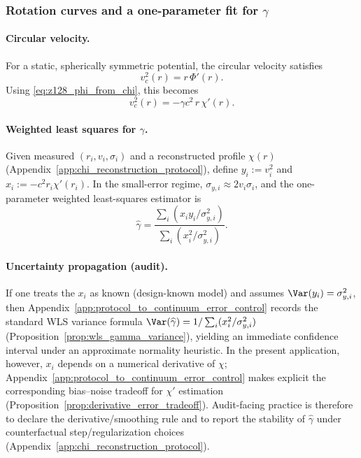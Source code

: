 \subsubsection{Rotation curves and a one-parameter fit for \texorpdfstring{$\gamma$}{gamma}}
\label{subsec:z128_gamma_fit}

\paragraph{Circular velocity.}
For a static, spherically symmetric potential, the circular velocity satisfies
\[
v_c^2(r)=r\,\Phi'(r).
\]
Using \eqref{eq:z128_phi_from_chi}, this becomes
\begin{equation}
\label{eq:z128_vc_from_chi}
v_c^2(r)=-\gamma c^2\,r\,\chi'(r).
\end{equation}

\paragraph{Weighted least squares for \texorpdfstring{$\gamma$}{gamma}.}
\InterfaceTag Given measured $(r_i,v_i,\sigma_i)$ and a reconstructed profile $\chi(r)$ (Appendix~\ref{app:chi_reconstruction_protocol}),
define $y_i:=v_i^2$ and $x_i:=-c^2 r_i\chi'(r_i)$.
In the small-error regime, $\sigma_{y,i}\approx 2v_i\sigma_i$, and the one-parameter weighted least-squares estimator is
\[
\widehat\gamma
=\frac{\sum_i (x_i y_i/\sigma_{y,i}^2)}{\sum_i (x_i^2/\sigma_{y,i}^2)}.
\]

\paragraph{Uncertainty propagation (audit).}
\AuditTag If one treats the $x_i$ as known (design-known model) and assumes $\Var(y_i)=\sigma_{y,i}^2$, then Appendix~\ref{app:protocol_to_continuum_error_control} records the standard WLS variance formula
$\Var(\widehat\gamma)=1/\sum_i (x_i^2/\sigma_{y,i}^2)$ (Proposition~\ref{prop:wls_gamma_variance}), yielding an immediate confidence interval under an approximate normality heuristic.
In the present application, however, $x_i$ depends on a numerical derivative of $\chi$; Appendix~\ref{app:protocol_to_continuum_error_control} makes explicit the corresponding bias--noise tradeoff for $\chi'$ estimation (Proposition~\ref{prop:derivative_error_tradeoff}).
Audit-facing practice is therefore to declare the derivative/smoothing rule and to report the stability of $\widehat\gamma$ under counterfactual step/regularization choices (Appendix~\ref{app:chi_reconstruction_protocol}).

